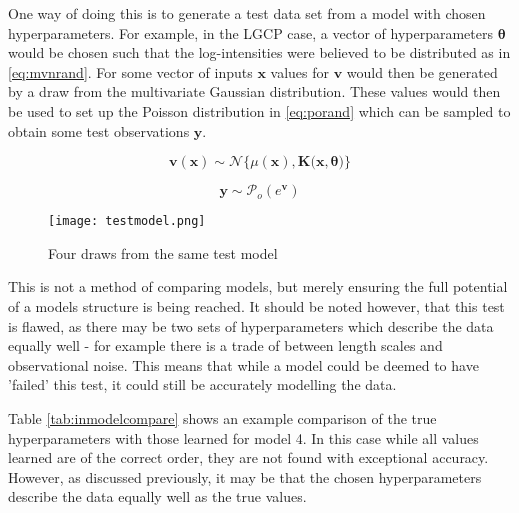\documentclass[a4paper,11pt]{report}
\begin{document}
One way of doing this is to generate a test data set from a model with chosen hyperparameters. For example, in the LGCP case, a vector of hyperparameters \(\boldsymbol{\theta}\) would be chosen such that the log-intensities were believed to be distributed as in \ref{eq:mvnrand}. For some vector of inputs \(\mathbf{x}\) values for \(\mathbf{v}\) would then be generated by a draw from the multivariate Gaussian distribution. These values would then be used to set up the Poisson distribution in \ref{eq:porand} which can be sampled to obtain some test observations \(\mathbf{y}\).

\singlespacing
\begin{equation} \label{eq:mvnrand}
\mathbf{v(x)} \sim \mathcal{N}\{\mu(\mathbf{x}), \mathbf{K(x},\boldsymbol{\theta})\}
\end{equation}

\begin{equation} \label{eq:porand}
\mathbf{y} \sim \mathcal{P}_o (e^{\mathbf{v}})
\end{equation}
\doublespacing

\begin{figure}
\centering
\texttt{[image: testmodel.png]}
\caption{Four draws from the same test model}
\label{fig:testmodel}
\end{figure}

This is not a method of comparing models, but merely ensuring the full potential of a models structure is being reached. It should be noted however, that this test is flawed, as there may be two sets of hyperparameters which describe the data equally well - for example there is a trade of between length scales and observational noise. This means that while a model could be deemed to have 'failed' this test, it could still be accurately modelling the data. \par

Table \ref{tab:inmodelcompare} shows an example comparison of the true hyperparameters with those learned for model 4. In this case while all values learned are of the correct order, they are not found with exceptional accuracy. However, as discussed previously, it may be that the chosen hyperparameters describe the data equally well as the true values.
\end{document}
